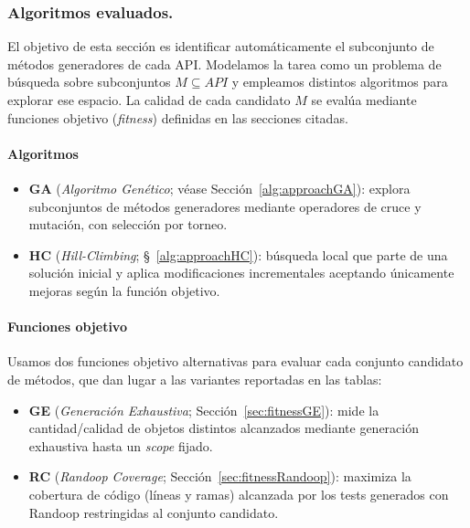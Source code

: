 \subsubsection{Algoritmos evaluados.}

El objetivo de esta sección es identificar automáticamente el subconjunto de métodos generadores de cada API. 
Modelamos la tarea como un problema de búsqueda sobre subconjuntos \(M \subseteq API\) y empleamos distintos algoritmos 
para explorar ese espacio. La calidad de cada candidato \(M\) se evalúa mediante funciones objetivo 
(\emph{fitness}) definidas en las secciones citadas.

\paragraph{Algoritmos}
\begin{itemize}
  \item \textbf{GA} (\emph{Algoritmo Genético}; véase Sección~\ref{alg:approachGA}): explora subconjuntos de métodos generadores mediante operadores de cruce y mutación, con selección por torneo.
  \item \textbf{HC} (\emph{Hill-Climbing}; \S~\ref{alg:approachHC}): búsqueda local que parte de una solución inicial y aplica modificaciones incrementales aceptando únicamente mejoras según la función objetivo.
\end{itemize}

\paragraph{Funciones objetivo}
Usamos dos funciones objetivo alternativas para evaluar cada conjunto candidato de métodos, 
que dan lugar a las variantes reportadas en las tablas:

\begin{itemize}
  \item \textbf{GE} (\emph{Generación Exhaustiva}; Sección~\ref{sec:fitnessGE}):
mide la cantidad/calidad de objetos distintos alcanzados mediante generación exhaustiva hasta un \emph{scope} fijado.
  \item \textbf{RC} (\emph{Randoop Coverage}; Sección~\ref{sec:fitnessRandoop}): maximiza la cobertura de código (líneas y ramas) alcanzada por los tests generados con Randoop restringidas al conjunto candidato. 
\end{itemize}


